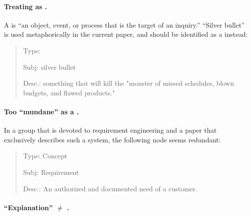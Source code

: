 \paragraph{Treating  as .}

A  is ``an object, event, or process that is the target
of an inquiry.'' ``Silver bullet'' is used metaphorically in the current
paper, and should be identified as a  instead:

\small
\begin{quote}
  \begin{itemizenoindent}
    
  \item {\sf Type}: 
 
  \item {\sf Subj}: silver bullet
 
  \item {\sf Desc.}: something that will kill the "monster of missed
    schedules, blown budgets, and flawed products."

 \end{itemizenoindent}
\end{quote}
\normalsize
{}


\paragraph{Too ``mundane'' as a .}

In a group that is devoted to requirement engineering and a paper that
exclusively describes such a system, the following 
node seems redundant:

\small
\begin{quote}
  \begin{itemizenoindent}

\item {\sf Type}: Concept
 
\item {\sf Subj}: Requirement
 
\item {\sf Desc.}: An authorized and documented need of a customer.

 \end{itemizenoindent}
\end{quote}
\normalsize
{}


\paragraph{``Explanation'' \(\neq\) .}

